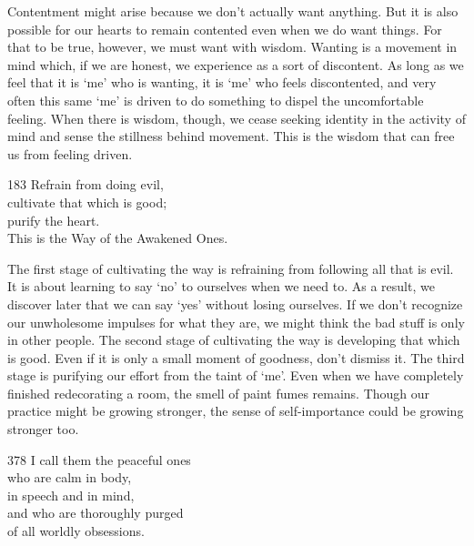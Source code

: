 \begin{dhpRefl}
  Contentment might arise because we don’t actually want anything. But it is
  also possible for our hearts to remain contented even when we do want things.
  For that to be true, however, we must want with wisdom. Wanting is a movement
  in mind which, if we are honest, we experience as a sort of discontent. As
  long as we feel that it is ‘me’ who is wanting, it is ‘me’ who feels
  discontented, and very often this same ‘me’ is driven to do something to
  dispel the uncomfortable feeling. When there is wisdom, though, we cease
  seeking identity in the activity of mind and sense the stillness behind
  movement. This is the wisdom that can free us from feeling driven.
\end{dhpRefl}


\begin{dhpVerse}{183}
\label{dhp-183}
Refrain from doing evil,\\
cultivate that which is good;\\
purify the heart.\\
This is the Way of the Awakened Ones.
\end{dhpVerse}

\begin{dhpRefl}
  The first stage of cultivating the way is refraining from following all that
  is evil. It is about learning to say ‘no’ to ourselves when we need to. As a
  result, we discover later that we can say ‘yes’ without losing ourselves. If
  we don’t recognize our unwholesome impulses for what they are, we might think
  the bad stuff is only in other people. The second stage of cultivating the way
  is developing that which is good. Even if it is only a small moment of
  goodness, don’t dismiss it. The third stage is purifying our effort from the
  taint of ‘me’. Even when we have completely finished redecorating a room, the
  smell of paint fumes remains. Though our practice might be growing stronger,
  the sense of self-importance could be growing stronger too.
\end{dhpRefl}


\begin{dhpVerse}{378}
\label{dhp-378}
I call them the peaceful ones\\
who are calm in body,\\
in speech and in mind,\\
and who are thoroughly purged\\
of all worldly obsessions.
\end{dhpVerse}

